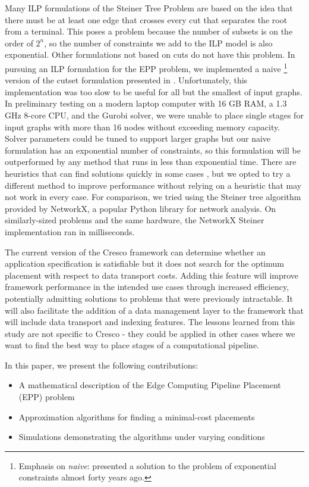 \documentclass[conference]{IEEEtran}
\begin{document}
 	Many ILP formulations of the Steiner Tree Problem are based on the idea that there must be at least one edge that crosses every cut that separates the root from a terminal. This poses a problem because the number of subsets is on the order of $2^n$, so the number of constraints we add to the ILP model is also exponential. Other formulations not based on cuts do not have this problem. In pursuing an ILP formulation for the EPP problem, we implemented a naive \footnote{Emphasis on \textit{naive}: \cite{Aneja1980AnIL} presented a solution to the problem of exponential constraints almost forty years ago.}  version of the cutset formulation presented in \cite{Koch1998SolvingST}. Unfortunately, this implementation was too slow to be useful for all but the smallest of input graphs. In preliminary testing on a modern laptop computer with 16 GB RAM, a 1.3 GHz 8-core CPU, and the Gurobi solver, we were unable to place single stages for input graphs with more than 16 nodes without exceeding memory capacity. Solver parameters could be tuned to support larger graphs \cite{gurobi_ref} but our naive formulation has an exponential number of constraints, so this formulation will be outperformed by any method that runs in less than exponential time. There are heuristics that can find solutions quickly in some cases \cite{gurobiLazy}, but we opted to try a different method to improve performance without relying on a heuristic that may not work in every case.  For comparison, we tried using the Steiner tree algorithm provided by NetworkX, a popular Python library for network analysis\cite{Hagberg2008ExploringNS}. On similarly-sized problems and the same hardware, the NetworkX Steiner implementation ran in milliseconds.

     The current version of the Cresco framework can determine whether an application specification is satisfiable but it does not search for the optimum placement with respect to data transport costs. Adding this feature will improve framework performance in the intended use cases through increased efficiency, potentially admitting solutions to problems that were previously intractable. It will also facilitate the addition of a data management layer to the framework that will include data transport and indexing features. The lessons learned from this study are not specific to Cresco - they could be applied in other cases where we want to find the best way to place stages of a computational pipeline.
    
    In this paper, we present the following contributions:
    \begin{itemize}
    	\item A mathematical description of the Edge Computing Pipeline Placement (EPP) problem
    	\item Approximation algorithms for finding a minimal-cost placements
 	    \item Simulations demonstrating the algorithms under varying conditions
    \end{itemize}
    
\end{document}
